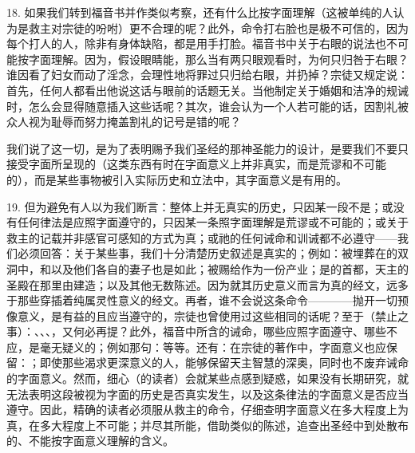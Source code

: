 18. 如果我们转到福音书并作类似考察，还有什么比按字面理解（这被单纯的人认为是救主对宗徒的吩咐）更不合理的呢？此外，命令打右脸也是极不可信的，因为每个打人的人，除非有身体缺陷，都是用手打脸。福音书中关于右眼的说法也不可能按字面理解。因为，假设眼睛能，那么当有两只眼观看时，为何只归咎于右眼？谁因看了妇女而动了淫念，会理性地将罪过只归给右眼，并扔掉？宗徒又规定说：首先，任何人都看出他说这话与眼前的话题无关。当他制定关于婚姻和洁净的规诫时，怎么会显得随意插入这些话呢？其次，谁会认为一个人若可能的话，因割礼被众人视为耻辱而努力掩盖割礼的记号是错的呢？\newline{}\par

我们说了这一切，是为了表明赐予我们圣经的那神圣能力的设计，是要我们不要只接受字面所呈现的（这类东西有时在字面意义上并非真实，而是荒谬和不可能的），而是某些事物被引入实际历史和立法中，其字面意义是有用的。\par

19. 但为避免有人以为我们断言：整体上并无真实的历史，只因某一段不是；或没有任何律法是应照字面遵守的，只因某一条照字面理解是荒谬或不可能的；或关于救主的记载并非感官可感知的方式为真；或祂的任何诫命和训诫都不必遵守——我们必须回答：关于某些事，我们十分清楚历史叙述是真实的；例如：被埋葬在的双洞中，和以及他们各自的妻子也是如此；被赐给作为一份产业；是的首都，天主的圣殿在那里由建造；以及其他无数陈述。因为就其历史意义而言为真的经文，远多于那些穿插着纯属灵性意义的经文。再者，谁不会说这条命令————抛开一切预像意义，是有益的且应当遵守的，宗徒也曾使用过这些相同的话呢？至于（禁止之事）：、、、，又何必再提？此外，福音中所含的诫命，哪些应照字面遵守、哪些不应，是毫无疑义的；例如那句：等等。还有：在宗徒的著作中，字面意义也应保留：；即使那些渴求更深意义的人，能够保留天主智慧的深奥，同时也不废弃诫命的字面意义。然而，细心（的读者）会就某些点感到疑惑，如果没有长期研究，就无法表明这段被视为字面的历史是否真实发生，以及这条律法的字面意义是否应当遵守。因此，精确的读者必须服从救主的命令，仔细查明字面意义在多大程度上为真，在多大程度上不可能；并尽其所能，借助类似的陈述，追查出圣经中到处散布的、不能按字面意义理解的含义。\newline{}\par

